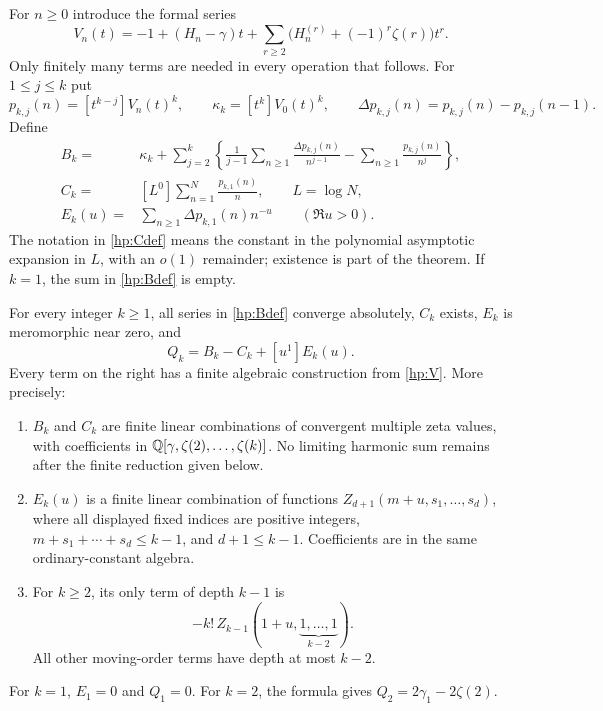 For $n\ge0$ introduce the formal series
\begin{equation}\label{hp:V}
 V_n(t)=-1+(H_n-\gamma)t
           +\sum_{r\ge2}\bigl(H_n^{(r)}+(-1)^r\zeta(r)\bigr)t^r.
\end{equation}
Only finitely many terms are needed in every operation that follows.
For $1\le j\le k$ put
\begin{equation}\label{hp:pdef}
 p_{k,j}(n)=[t^{k-j}]V_n(t)^k,
 \qquad \kappa_k=[t^k]V_0(t)^k,
 \qquad \Delta p_{k,j}(n)=p_{k,j}(n)-p_{k,j}(n-1).
\end{equation}
Define
\begin{align}
 B_k={}&\kappa_k+
   \sum_{j=2}^k\left\{
    \frac1{j-1}\sum_{n\ge1}\frac{\Delta p_{k,j}(n)}{n^{j-1}}
        -\sum_{n\ge1}\frac{p_{k,j}(n)}{n^j}\right\},
       \label{hp:Bdef}\\
 C_k={}&[L^0]\sum_{n=1}^N\frac{p_{k,1}(n)}n,
       \qquad L=\log N,\label{hp:Cdef}\\
 E_k(u)={}&\sum_{n\ge1}\Delta p_{k,1}(n)n^{-u}
       \qquad(\Re u>0).\label{hp:Edef}
\end{align}
The notation in \eqref{hp:Cdef} means the constant in the polynomial
asymptotic expansion in $L$, with an $o(1)$ remainder; existence is
part of the theorem. If $k=1$, the sum in \eqref{hp:Bdef} is empty.

\begin{theorem}\label{hp:allpowers}
For every integer $k\ge1$, all series in \eqref{hp:Bdef} converge
absolutely, $C_k$ exists, $E_k$ is meromorphic near zero, and
\begin{equation}\label{hp:universal}
 \boxed{\displaystyle Q_k=B_k-C_k+[u^1]E_k(u).}
\end{equation}
Every term on the right has a finite algebraic construction from
\eqref{hp:V}. More precisely:
\begin{enumerate}
 \item $B_k$ and $C_k$ are finite linear combinations of convergent
 multiple zeta values, with coefficients in
 $\mathbb Q[\gamma,\zeta(2),\ldots,\zeta(k)]$. No limiting harmonic sum
 remains after the finite reduction given below.
 \item $E_k(u)$ is a finite linear combination of functions
 $Z_{d+1}(m+u,s_1,\ldots,s_d)$, where all displayed fixed indices are
 positive integers, $m+s_1+\cdots+s_d\le k-1$, and $d+1\le k-1$.
 Coefficients are in the same ordinary-constant algebra.
 \item For $k\ge2$, its only term of depth $k-1$ is
 \begin{equation}\label{hp:topdepth}
   -k!\,Z_{k-1}(1+u,\underbrace{1,\ldots,1}_{k-2}).
 \end{equation}
 All other moving-order terms have depth at most $k-2$.
\end{enumerate}
For $k=1$, $E_1=0$ and $Q_1=0$. For $k=2$, the formula gives
$Q_2=2\gamma_1-2\zeta(2)$.
\end{theorem}

